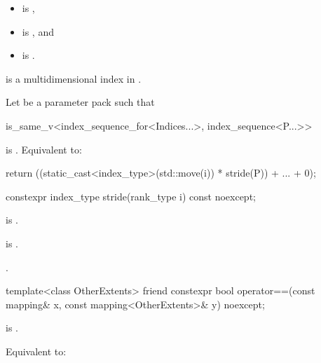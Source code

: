 \begin{itemdescr}
\pnum
\constraints
\begin{itemize}
\item
{} is ,
\item
{} is , and
\item
{} is
.
\end{itemize}

\pnum
\expects
{} is
a multidimensional index in .

\pnum
\effects
Let  be a parameter pack such that
\begin{codeblock}
is_same_v<index_sequence_for<Indices...>, index_sequence<P...>>
\end{codeblock}
is . Equivalent to:
\begin{codeblock}
return ((static_cast<index_type>(std::move(i)) * stride(P)) + ... + 0);
\end{codeblock}
\end{itemdescr}

%
\begin{itemdecl}
constexpr index_type stride(rank_type i) const noexcept;
\end{itemdecl}

\begin{itemdescr}
\pnum
\constraints
{} is .

\pnum
\expects
{} is .

\pnum
\returns
{}.
\end{itemdescr}

%
\begin{itemdecl}
template<class OtherExtents>
  friend constexpr bool operator==(const mapping& x, const mapping<OtherExtents>& y) noexcept;
\end{itemdecl}

\begin{itemdescr}
\pnum
\constraints
{} is .

\pnum
\effects
Equivalent to: 
\end{itemdescr}

